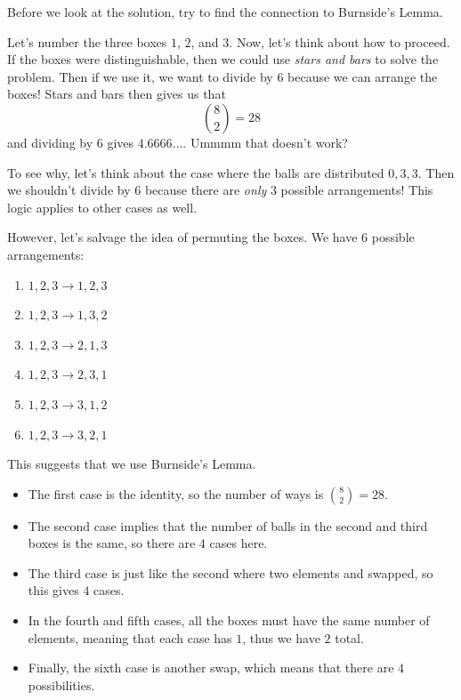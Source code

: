 \documentclass[11pt]{scrartcl}
\begin{document}
Before we look at the solution, try to find the connection to Burnside's Lemma. 

\vspace{0.2cm}

Let's number the three boxes $1$, $2$, and $3$. Now, let's think about how to proceed. If the boxes were distinguishable, then we could use \textit{stars and bars} to solve the problem. Then if we use it, we want to divide by $6$ because we can arrange the boxes! Stars and bars then gives us that \[\binom{8}{2} = 28\] and dividing by $6$ gives $4.6666\dots$. Ummmm that doesn't work?
\vspace{0.1cm}

To see why, let's think about the case where the balls are distributed $0,3,3$. Then we shouldn't divide by $6$ because there are \textit{only} $3$ possible arrangements! This logic applies to other cases as well.
\vspace{0.1cm}

However, let's salvage the idea of permuting the boxes. We have $6$ possible arrangements:
\begin{enumerate}
\item $1,2,3 \rightarrow 1,2,3$
\item $1,2,3 \rightarrow 1,3,2$
\item $1,2,3 \rightarrow 2,1,3$
\item $1,2,3 \rightarrow 2,3,1$
\item $1,2,3 \rightarrow 3,1,2$
\item $1,2,3 \rightarrow 3,2,1$
\end{enumerate}

This suggests that we use Burnside's Lemma.

\begin{itemize}
\item The first case is the identity, so the number of ways is $\binom{8}{2}=28$.
\item The second case implies that the number of balls in the second and third boxes is the same, so there are $4$ cases here.
\item The third case is just like the second where two elements and swapped, so this gives $4$ cases.
\item In the fourth and fifth cases, all the boxes must have the same number of elements, meaning that each case has $1$, thus we have $2$ total.
\item Finally, the sixth case is another swap, which means that there are $4$ possibilities.
\end{itemize}
\end{document}
